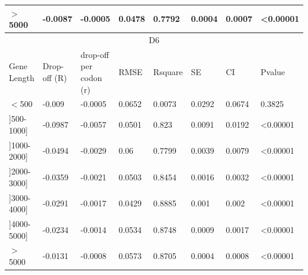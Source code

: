 \documentclass[a4,center]{NAR} %
\begin{document}
\begin{table}[t]
{\begin{tabular} {|l|l|l|l|l|l|l|l|}
$>$5000&-0.0087 &-0.0005& 0.0478 & 0.7792 & 0.0004 & 0.0007  &\textless 0.00001   \\
\hline
\multicolumn{8}{|c|}{D6} \\
\hline
Gene Length&Drop-off (R) & drop-off per codon (r)&RMSE& Rsquare &SE&CI &Pvalue\\
\hline
$<$500&-0.009&-0.0005&0.0652&0.0073&0.0292&0.0674&0.3825  \\
\hline
]500-1000]&-0.0987&-0.0057&0.0501&0.823&0.0091&0.0192&\textless 0.00001 \\
\hline
]1000-2000]&-0.0494&-0.0029&0.06&0.7799&0.0039&0.0079&\textless 0.00001  \\
\hline
]2000-3000]&-0.0359&-0.0021&0.0503&0.8454&0.0016&0.0032&\textless 0.00001  \\
\hline
]3000-4000]&-0.0291&-0.0017&0.0429&0.8885&0.001&0.002&\textless 0.00001 \\
\hline
]4000-5000]&-0.0234&-0.0014&0.0534&0.8748&0.0009&0.0017&\textless 0.00001  \\
\hline
$>$5000&-0.0131&-0.0008&0.0573&0.8705&0.0004&0.0008&\textless 0.00001  \\
\hline
\end{tabular}%
}

\end{table}
\end{document}
